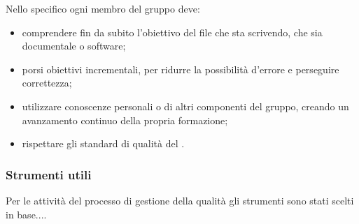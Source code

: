 Nello specifico ogni membro del gruppo deve:
\begin{itemize}
	\item comprendere fin da subito l'obiettivo del file che sta scrivendo, che sia documentale o software;
	\item porsi obiettivi incrementali, per ridurre la possibilità d'errore e perseguire correttezza;
	\item utilizzare conoscenze personali o di altri componenti del gruppo, creando un avanzamento continuo della propria formazione;
	\item rispettare gli standard di qualità del \PdQv.
\end{itemize}

\subsubsection{Strumenti utili}
Per le attività del processo di gestione della qualità gli strumenti sono stati scelti in base.... 

 

  
